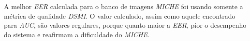 
\par A melhor \textit{\acrshort{EER}} calculada para o banco de imagens \textit{MICHE} foi usando somente a métrica de qualidade \textit{\acrshort{DSMI}}. O valor calculado, assim como aquele encontrado para \textit{\acrshort{AUC}}, são valores regulares, porque quanto maior a \textit{\acrshort{EER}}, pior o desempenho do sistema \cite{eer, d33BEAT} e reafirmam a dificuldade do \textit{MICHE}.


